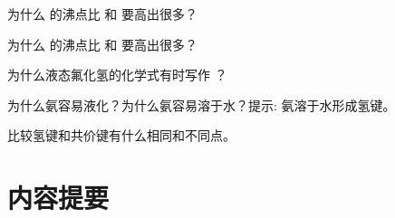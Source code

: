 \begin{Practice}[习题]
\begin{question}
  \item 为什么  的沸点比  和  要高出很多？
  \item 为什么  的沸点比  和  要高出很多？
  \item 为什么液态氟化氢的化学式有时写作 ？
  \item 为什么氨容易液化？为什么氨容易溶于水？提示: 氨溶于水形成氢键。
  \item 比较氢键和共价键有什么相同和不同点。
\end{question}
\end{Practice}

\section*{内容提要}
\setcounter{subsection}{0}
